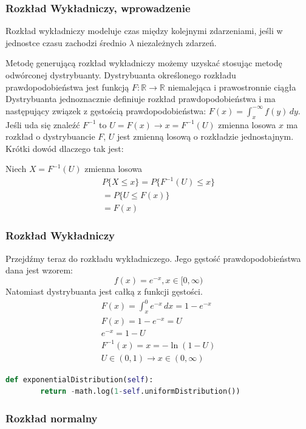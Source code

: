 \documentclass[9pt]{beamer}
\begin{document}
\begin{frame}
  \frametitle{Rozkład Wykładniczy, wprowadzenie}
  Rozkład wykładniczy modeluje czas między kolejnymi zdarzeniami, jeśli w jednostce czasu zachodzi średnio $\lambda$ niezależnych zdarzeń. 
  
  Metodę generującą rozkład wykładniczy możemy uzyskać stosując metodę odwórconej dystrybuanty. Dystrybuanta określonego rozkładu prawdopodobieństwa jest funkcją $F: \mathbb{R} \rightarrow \mathbb{R} $ niemalejąca i prawostronnie ciągła Dystrybuanta jednoznacznie definiuje rozkład prawdopodobieństwa i ma następujący związek z gęstością prawdopodobieństwa: $ F(x) =\int_{x}^{-\infty}  f(y) \,dy $. Jeśli uda się znaleźć $F^{-1}$ to $U=F(x) \rightarrow x=F^{-1}(U)$ zmienna losowa $x$ ma rozkład o dystrybuancie $F$, $U$ jest zmienną losową o rozkładzie jednostajnym. Krótki dowód dlaczego tak jest:

  Niech $X=F^{-1}(U)$ zmienna losowa
  \begin{gather*}
    P \{X\leq x\} = P\{F^{-1}(U)\leq x\} \\
    = P\{U\leq F(x)\} \\
    =F(x)
  \end{gather*}
\end{frame}
\begin{frame}[containsverbatim]
  \frametitle{Rozkład Wykładniczy}
  Przejdźmy teraz do rozkładu wykładniczego. Jego gęstość prawdopodobieństwa dana jest wzorem:
  \begin{equation*}
    f(x)=e^{-x},x\in [0,\infty)
  \end{equation*}
  Natomiast dystrybuanta jest całką z funkcji gęstości.
  \begin{gather*}
    F(x)=\int_{x}^{0}  e^{-x}\,dx =1-e^{-x} \\
    F(x)=1-e^{-x}=U \\
    e^{-x}=1-U \\
    F^{-1}(x)=x=-\ln(1-U) \\
    U \in (0,1) \rightarrow x\in (0, \infty)
  \end{gather*}
  \begin{lstlisting}[language=Python, caption=Metoda rozkładu Poissona]
    def exponentialDistribution(self):
        return -math.log(1-self.uniformDistribution())
    \end{lstlisting}
\end{frame}
\begin{frame}
  \frametitle{Rozkład normalny}
\end{frame}
\end{document}
